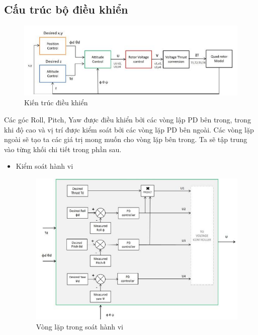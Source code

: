 {			\subsection{Cấu trúc bộ điều khiển}
			\begin{figure}[h!]
	        	\begin{center}
	        		\includegraphics[scale=0.8]{images/Cuong-ControlArchitecture.png}
	        		\caption{Kiến trúc điều khiển}
	        	\end{center}
        \end{figure}
			Các góc Roll, Pitch, Yaw được điều khiển bởi các vòng lập PD bên trong, trong khi độ cao và vị trí được kiểm soát bởi các vòng lặp PD bên ngoài. Các vòng lặp ngoài sẽ tạo ta các giá trị mong muốn cho vòng lặp bên trong. Ta sẽ tập trung vào từng khối chi tiết trong phần sau.
\\
			\begin{itemize}
			\item Kiểm soát hành vi
			\begin{figure}[h!]
	        	\begin{center}
	        		\includegraphics[scale=0.8]{images/Cuong-InnerloopIntiCon.png}
	        		\caption{Vòng lặp trong soát hành vi}

\end{center}
\end{figure}
\end{itemize}}
